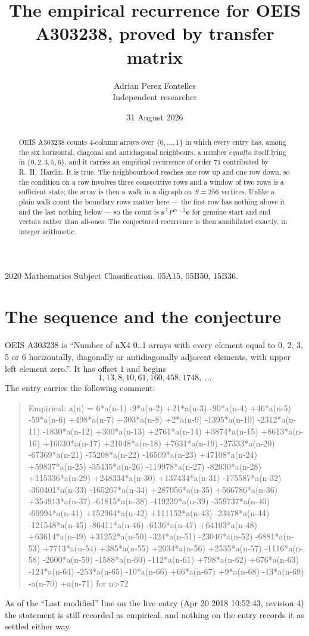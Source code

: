 \documentclass[11pt,a4paper]{article}
\title{The empirical recurrence for OEIS A303238, proved by transfer matrix}
\author{Adrian Perez Fontelles\\ \small Independent researcher}
\date{31 August 2026}
\theoremstyle{plain}
\theoremstyle{definition}
\begin{document}
\maketitle

\begin{abstract}
OEIS A303238 counts $4$-column arrays over $\{0,\dots,1\}$ in which every entry has,
among the six horizontal, diagonal and antidiagonal neighbours, a number $equal to$ itself lying in $\{0,2,3,5,6\}$, and it carries an empirical
recurrence of order $71$ contributed by R.~H.~Hardin. It is true. The neighbourhood
reaches one row up and one row down, so the condition on a row involves three consecutive
rows and a window of two rows is a sufficient state; the array is then a walk in a digraph
on $S=256$ vertices. Unlike a plain walk count the boundary rows matter here --- the first
row has nothing above it and the last nothing below --- so the count is
$\mathbf{s}^{\!\top}P^{\,n-2}\mathbf{e}$ for genuine start and end vectors rather than
all-ones. The conjectured recurrence is then annihilated exactly, in integer arithmetic.
\end{abstract}

\noindent\small 2020 Mathematics Subject Classification. 05A15, 05B50, 15B36.\normalsize

\section{The sequence and the conjecture}

OEIS A303238 is ``Number of nX4 0..1 arrays with every element equal to 0, 2, 3, 5 or 6 horizontally, diagonally or antidiagonally adjacent elements, with upper left element zero.''. It has offset
$1$ and begins
\[
1, 13, 8, 10, 61, 160, 458, 1748,\ \dots
\]
The entry carries the following comment:
\begin{quote}\small
Empirical: a(n) = 6*a(n-1) -9*a(n-2) +21*a(n-3) -90*a(n-4) +46*a(n-5) -59*a(n-6) +498*a(n-7) +303*a(n-8) +2*a(n-9) -1395*a(n-10) -2312*a(n-11) -1830*a(n-12) +300*a(n-13) +2761*a(n-14) +3874*a(n-15) +8613*a(n-16) +16030*a(n-17) +21048*a(n-18) +7631*a(n-19) -27333*a(n-20) -67369*a(n-21) -75208*a(n-22) -16509*a(n-23) +47108*a(n-24) +59837*a(n-25) -35435*a(n-26) -119978*a(n-27) -82030*a(n-28) +115336*a(n-29) +248334*a(n-30) +137434*a(n-31) -175587*a(n-32) -360401*a(n-33) -165267*a(n-34) +287056*a(n-35) +566786*a(n-36) +354913*a(n-37) -61815*a(n-38) -419239*a(n-39) -359737*a(n-40) -69994*a(n-41) +152964*a(n-42) +111152*a(n-43) -23478*a(n-44) -121548*a(n-45) -86411*a(n-46) -6136*a(n-47) +64103*a(n-48) +63614*a(n-49) +31252*a(n-50) -324*a(n-51) -23046*a(n-52) -6881*a(n-53) +7713*a(n-54) +385*a(n-55) +2034*a(n-56) +2535*a(n-57) -1116*a(n-58) -2600*a(n-59) -1588*a(n-60) -112*a(n-61) +798*a(n-62) +676*a(n-63) -124*a(n-64) -253*a(n-65) -10*a(n-66) +66*a(n-67) +9*a(n-68) -13*a(n-69) -a(n-70) +a(n-71) for n>72
\end{quote}
As of the ``Last modified'' line on the live entry (Apr 20 2018 10:52:43, revision
4) the statement is still recorded as empirical, and nothing on the entry
records it as settled either way.
\end{document}
